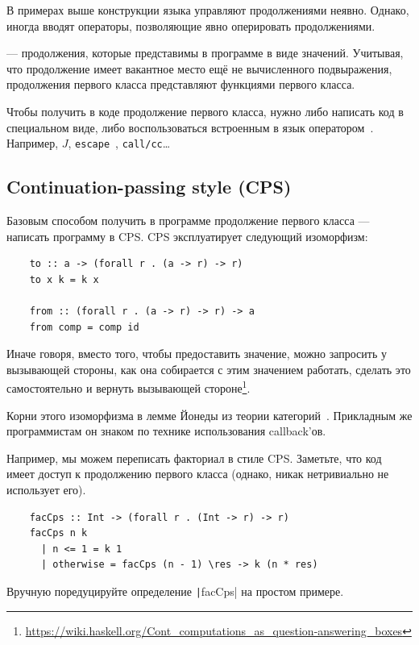 В примерах выше конструкции языка управляют продолжениями неявно.
Однако, иногда вводят операторы, позволяющие явно оперировать продолжениями.

 --- продолжения, которые представимы в программе в виде значений.
Учитывая, что продолжение имеет вакантное место ещё не вычисленного подвыражения, продолжения первого класса представляют функциями первого класса.

Чтобы получить в коде продолжение первого класса, нужно либо написать код в специальном виде, либо воспользоваться встроенным в язык оператором~\cite[приложение A]{hillerstrom2022foundations}.
Например, $J$, \texttt{escape}~\cite{reynolds1972definitional}, \texttt{call/cc}\ldots

\subsection{Continuation-passing style (CPS)}

Базовым способом получить в программе продолжение первого класса --- написать программу в CPS.
CPS эксплуатирует следующий изоморфизм:
\begin{verbatim}
    to :: a -> (forall r . (a -> r) -> r)
    to x k = k x

    from :: (forall r . (a -> r) -> r) -> a
    from comp = comp id
\end{verbatim}

Иначе говоря, вместо того, чтобы предоставить значение, можно запросить у вызывающей стороны, как она собирается с этим значением работать, сделать это самостоятельно и вернуть вызывающей стороне\footnote{\url{https://wiki.haskell.org/Cont_computations_as_question-answering_boxes}}.


Корни этого изоморфизма в лемме Йонеды из теории категорий~\cite{hinze2010reason}.
Прикладным же программистам он знаком по технике использования callback'ов.

Например, мы можем переписать факториал в стиле CPS.
Заметьте, что код имеет доступ к продолжению первого класса (однако, никак нетривиально не использует его).
\begin{verbatim}
    facCps :: Int -> (forall r . (Int -> r) -> r)
    facCps n k
      | n <= 1 = k 1
      | otherwise = facCps (n - 1) \res -> k (n * res)
\end{verbatim}

\begin{task}
    Вручную поредуцируйте определение \texttt|facCps| на простом примере.
\end{task}

